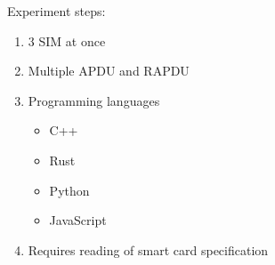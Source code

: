 
Experiment steps:

\begin{enumerate}
	\item 3 SIM at once
	\item Multiple APDU and RAPDU
	\item Programming languages
		\begin{itemize}
			\item C++
			\item Rust
			\item Python
			\item JavaScript
		\end{itemize}
	\item Requires reading of smart card specification
\end{enumerate}
